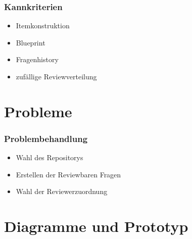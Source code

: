 \documentclass{beamer}
\begin{document}
		\begin{frame} %
		  	\frametitle{Kannkriterien} %
  			\begin{itemize}
  				\item Itemkonstruktion
			  	\item Blueprint
			    \item Fragenhistory
			    \item zufällige Reviewverteilung
			\end{itemize}
		\end{frame}

	\section{Probleme}
		\begin{frame} %
			\frametitle{Problembehandlung} %
    		\begin{itemize}
    			\item Wahl des Repositorys
		    	\item Erstellen der Reviewbaren Fragen
    			\item Wahl der Reviewerzuordnung
    		\end{itemize}
		\end{frame}

	\section{Diagramme und Prototyp}
		
\end{document}
